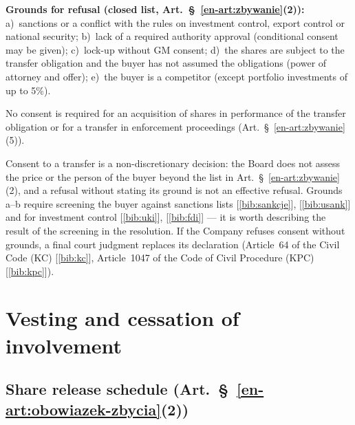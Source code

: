 \documentclass[11pt,a4paper]{report}
\newcommand{\Zr}[1]{[\ref{bib:#1}]}
\begin{document}
\textbf{Grounds for refusal (closed list, Art.~\S~\ref{en-art:zbywanie}(2)):} a)~sanctions or a conflict with the rules on investment control, export control or national security; b)~lack of a required authority approval (conditional consent may be given); c)~lock-up without GM consent; d)~the shares are subject to the transfer obligation and the buyer has not assumed the obligations (power of attorney and offer); e)~the buyer is a competitor (except portfolio investments of up to 5\%).

No consent is required for an acquisition of shares in performance of the transfer obligation or for a transfer in enforcement proceedings (Art.~\S~\ref{en-art:zbywanie}(5)).

\begin{Komentarz}
Consent to a transfer is a non-discretionary decision: the Board does not assess the price or the person of the buyer beyond the list in Art.~\S~\ref{en-art:zbywanie}(2), and a refusal without stating its ground is not an effective refusal. Grounds a--b require screening the buyer against sanctions lists \Zr{sankcje}, \Zr{usank} and for investment control \Zr{uki}, \Zr{fdi} --- it is worth describing the result of the screening in the resolution. If the Company refuses consent without grounds, a final court judgment replaces its declaration (Article~64 of the Civil Code (KC) \Zr{kc}, Article~1047 of the Code of Civil Procedure (KPC) \Zr{kpc}).
\end{Komentarz}

\section{Vesting and cessation of involvement}

\subsection*{Share release schedule (Art.~\S~\ref{en-art:obowiazek-zbycia}(2))}
\end{document}
